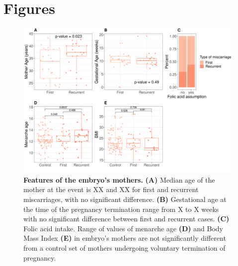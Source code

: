 \section*{Figures}



\begin{figure}[ht]
\centering
\includegraphics[width=\linewidth]{fig/panel_stats.png}
\caption{\textbf{Features of the embryo's mothers.} \textbf{(A)} Median age of the mother at the event is XX and XX for first and recurrent miscarriages, with no significant difference. \textbf{(B)} Gestational age at the time of the pregnancy termination range from X to X weeks with no significant difference between first and recurrent cases.  \textbf{(C)} Folic acid intake. Range of values of menarche age \textbf{(D)} and Body Mass Index \textbf{(E)} in embryo's mothers are not significantly different from a control set of mothers undergoing voluntary termination of pregnancy.}
\label{fig:embryostats}
\end{figure}

